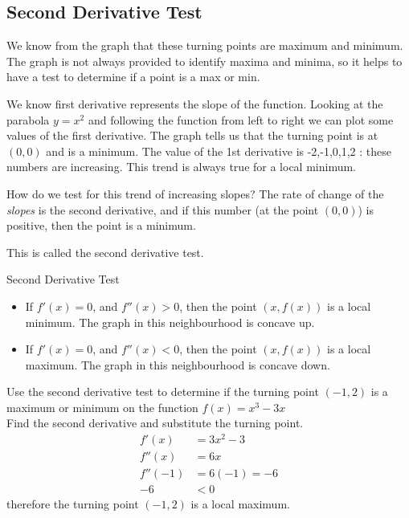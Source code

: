 \subsection*{Second Derivative Test}\label{sec:2ndDerivativeTest}
We know from the graph that these turning points are maximum and minimum. The graph is not always provided to identify maxima and minima, so it helps to have a test to determine if a point is a max or min. 

We know first derivative represents the slope of the function. Looking at the parabola $y=x^2$ and following the function from left to right we can plot some values of the first derivative. The graph tells us that the turning point is at $(0,0)$ and is a minimum. The value of the 1st derivative is -2,-1,0,1,2 : these numbers are increasing. This trend is always true for a local minimum. 

How do we test for this trend of increasing slopes? The rate of change of the \emph{slopes} is the second derivative, and if this number (at the point $(0,0)$) is positive, then the point is a minimum.

This is called the second derivative test.\\
\begin{tcolorbox}
	Second Derivative Test
	\begin{itemize}
		\item If $f'(x)=0$, and $f''(x)>0$, then the point $(x,f(x))$ is a local minimum. The graph in this neighbourhood is concave up.\\
		\item If $f'(x)=0$, and $f''(x)<0$, then the point $(x,f(x))$ is a local maximum. The graph in this neighbourhood is concave down.\\                          
	\end{itemize}
\end{tcolorbox}


\example Use the second derivative test to determine if the turning point $(-1,2)$ is a maximum or minimum on the function $f(x)=x^3-3x$\\
\solution Find the second derivative and substitute the turning point.
\begin{align*}
f'(x)&=3x^2-3\\
f''(x)&=6x\\
f''(-1)&=6(-1)=-6\\
-6&<0
\end{align*}therefore the turning point $(-1,2)$ is a local maximum.

